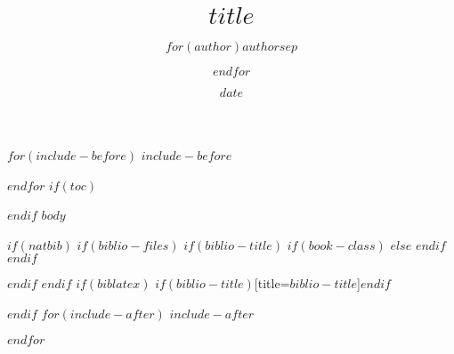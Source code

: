 \documentclass[11pt]{article}
\title{$title$}
\author{$for(author)$$author$$sep$ \and $endfor$}
\date{$date$}
\begin{document}

$for(include-before)$
$include-before$

$endfor$
$if(toc)$
\tableofcontents

$endif$
$body$

$if(natbib)$
$if(biblio-files)$
$if(biblio-title)$
$if(book-class)$
\renewcommand\bibname{$biblio-title$}
$else$
\renewcommand\refname{$biblio-title$}
$endif$
$endif$


$endif$
$endif$
$if(biblatex)$
\printbibliography$if(biblio-title)$[title=$biblio-title$]$endif$

$endif$
$for(include-after)$
$include-after$

$endfor$
\end{document}

